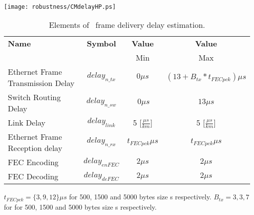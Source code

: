 \begin{center}
	\texttt{[image: robustness/CMdelayHP.ps]}
	\label{fig:CMdelayHP}
\end{center}

\begin{table}[ht]
\caption{Elements of \ControlMessage\ frame delivery delay estimation.} 
\centering
	\begin{tabular}{| l |  c | c | c |}          \hline
\textbf{Name}&\textbf{Symbol}&\textbf{Value}&\textbf{Value}                  \\
                                 &                &  Min& Max          \\ \hline
Ethernet Frame Transmission Delay&$delay_{n\_tx}$&$0\mu s$&$(13 + B_{tx}
*t_{FECpck})
\mu s$
\\ \hline
Switch Routing Delay            &$delay_{n\_sw}$&$~0\mu s$&$13\mu s$ 
 
\\ \hline
Link Delay                       & $delay_{link}$ &5 [$\frac{\mu
s}{km}$]&5 [$\frac{\mu s}{km}$]      
\\ \hline
Ethernet Frame Reception delay   & $delay_{n\_rx}$&$t_{FECpck}\mu
s$&$t_{FECpck}\mu s$
\\ \hline
FEC Encoding                     & $delay_{enFEC}$&$2\mu s$&$2\mu s$
\\ \hline
FEC Decoding                     & $delay_{deFEC}$&$2\mu s$&$2\mu s$
\\ \hline

\end{tabular}
\label{tab:CMdelayHP}
\end{table}

$t_{FECpck} = \{3,9,12\} \mu s$ for 500, 1500 and 5000 bytes size
\ControlMessage s respectively.
$B_{tx} = {3,3,7}$ for for 500, 1500 and 5000 bytes size \ControlMessage s
respectively.
 
